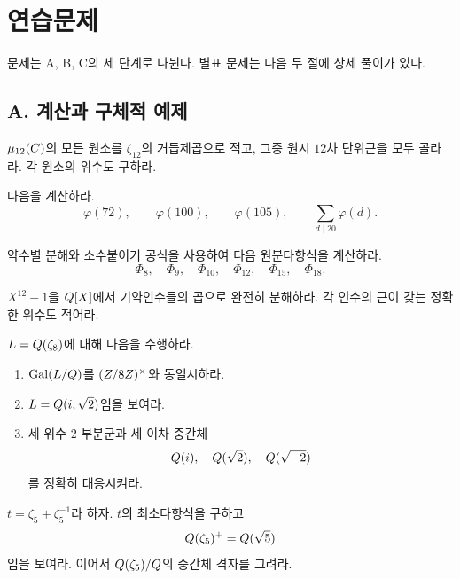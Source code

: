 \clearpage
\section{연습문제}
\label{sec:cyclotomic-cyclic-exercises}

문제는 A, B, C의 세 단계로 나뉜다. 별표 문제는 다음 두 절에 상세 풀이가 있다.

\subsection*{A. 계산과 구체적 예제}

\begin{exercise}[*]
$\mu_{12}(C)$의 모든 원소를 $\zeta_{12}$의 거듭제곱으로 적고, 그중 원시 $12$차 단위근을 모두 골라라. 각 원소의 위수도 구하라.
\end{exercise}

\begin{exercise}
다음을 계산하라.
\[
  \varphi(72),\qquad
  \varphi(100),\qquad
  \varphi(105),\qquad
  \sum_{d\mid20}\varphi(d).
\]
\end{exercise}

\begin{exercise}[*]
약수별 분해와 소수붙이기 공식을 사용하여 다음 원분다항식을 계산하라.
\[
  \Phi_8,\quad\Phi_9,\quad\Phi_{10},
  \quad\Phi_{12},\quad\Phi_{15},\quad\Phi_{18}.
\]
\end{exercise}

\begin{exercise}
$X^{12}-1$을 $Q[X]$에서 기약인수들의 곱으로 완전히 분해하라. 각 인수의 근이 갖는 정확한 위수도 적어라.
\end{exercise}

\begin{exercise}[*]
$L=Q(\zeta_8)$에 대해 다음을 수행하라.
\begin{enumerate}[label=(\alph*)]
  \item $\operatorname{Gal}(L/Q)$를 $(Z/8Z)^\times$와 동일시하라.
  \item $L=Q(i,\sqrt2)$임을 보여라.
  \item 세 위수 $2$ 부분군과 세 이차 중간체
  \[
    Q(i),\quad Q(\sqrt2),\quad Q(\sqrt{-2})
  \]
  를 정확히 대응시켜라.
\end{enumerate}
\end{exercise}

\begin{exercise}[*]
$t=\zeta_5+\zeta_5^{-1}$라 하자. $t$의 최소다항식을 구하고
\[
  Q(\zeta_5)^+=Q(\sqrt5)
\]
임을 보여라. 이어서 $Q(\zeta_5)/Q$의 중간체 격자를 그려라.
\end{exercise}

